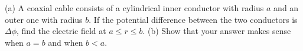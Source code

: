 (a) A coaxial cable consists of a cylindrical inner conductor with
radius $a$ and an outer one with radius $b$. If the potential
difference between the two conductors is $\Delta\phi$, find
the electric field at $a\le r\le b$.\answercheck\hwendpart
(b) Show that your answer makes sense
when $a=b$ and when $b<a$.
